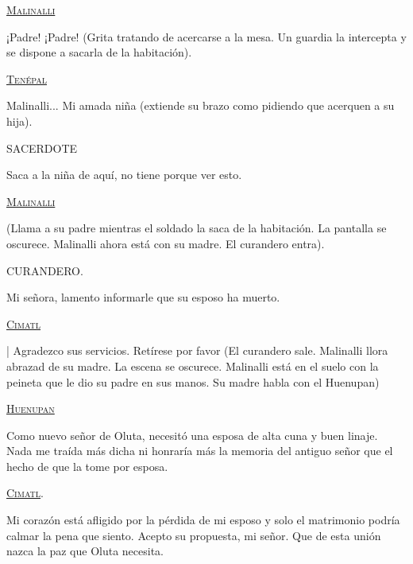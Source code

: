 \begin{center}
\textsc{\underline{Malinalli}}
\\
\par
¡Padre! ¡Padre! (Grita tratando de acercarse a la mesa. Un guardia la intercepta y se dispone a sacarla de la habitación). 
\\
\par
\textsc{\underline{Tenépal}}
\\
\par
Malinalli... Mi amada niña (extiende su brazo como pidiendo que acerquen a su hija).
\\
\par
SACERDOTE
\\
\par
Saca a la niña de aquí, no tiene porque ver esto.
\\
\par
\textsc{\underline{Malinalli}}
\\
\par
(Llama a su padre mientras el soldado la saca de la habitación. La pantalla se oscurece. Malinalli ahora está con su madre. El curandero entra).
\\
\par
CURANDERO.
\\
\par
Mi señora, lamento informarle que su esposo ha muerto.
\\
\par
\textsc{\underline{Cimatl}}
\\
\par|
Agradezco sus servicios. Retírese por favor (El curandero sale. Malinalli llora abrazad de su madre. La escena se oscurece. Malinalli está en el suelo con la peineta que le dio su padre en sus manos. Su madre habla con el Huenupan)
\\
\par
\textsc{\underline{Huenupan}}
\\
\par
Como nuevo señor de Oluta, necesitó una esposa de alta cuna y buen linaje. Nada me traída más dicha ni honraría más la memoria del antiguo señor que el hecho de que la tome por esposa.
\\
\par
\textsc{\underline{Cimatl}}.
\\
\par
Mi corazón está afligido por la pérdida de mi esposo y solo el matrimonio podría calmar la pena que siento. Acepto su propuesta, mi señor. Que de esta unión nazca la paz que Oluta necesita.
\end{center}
